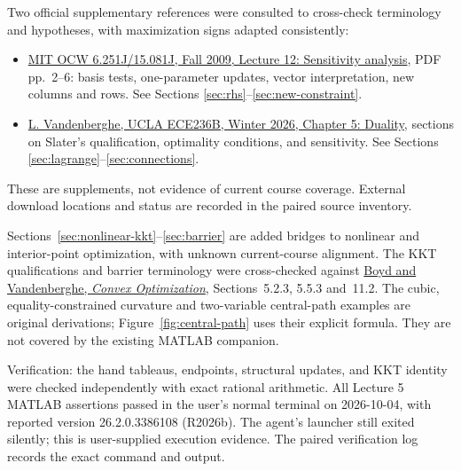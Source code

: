 \documentclass[11pt,a4paper]{article}
\begin{document}
{  Two official supplementary references were consulted to cross-check terminology
  and hypotheses, with maximization signs adapted consistently:
  \begin{itemize}[leftmargin=*]
    \item \href{https://ocw.mit.edu/courses/6-251j-introduction-to-mathematical-programming-fall-2009/370982a2d3b22e090aa7a8d573bb5604_MIT6_251JF09_lec12.pdf}
          {MIT OCW 6.251J/15.081J, Fall 2009, Lecture 12: Sensitivity analysis},
          PDF pp.\ 2--6: basis tests, one-parameter updates, vector interpretation,
          new columns and rows. See Sections \ref{sec:rhs}--\ref{sec:new-constraint}.
    \item \href{https://www.seas.ucla.edu/~vandenbe/ee236b/lectures/duality.pdf}
          {L. Vandenberghe, UCLA ECE236B, Winter 2026, Chapter 5: Duality},
          sections on Slater's qualification, optimality conditions, and sensitivity.
          See Sections \ref{sec:lagrange}--\ref{sec:connections}.
  \end{itemize}
  These are supplements, not evidence of current course coverage. External
  download locations and status are recorded in the paired source inventory.

  Sections~\ref{sec:nonlinear-kkt}--\ref{sec:barrier} are added bridges to
  nonlinear and interior-point optimization, with unknown current-course
  alignment. The KKT qualifications and barrier terminology were cross-checked
  against \href{https://web.stanford.edu/~boyd/cvxbook/}{Boyd and Vandenberghe,
    \emph{Convex Optimization}}, Sections~5.2.3, 5.5.3 and~11.2.
  The cubic, equality-constrained curvature and two-variable central-path
  examples are original derivations; Figure~\ref{fig:central-path} uses their
  explicit formula. They are not covered by the existing MATLAB companion.

  Verification: the hand tableaus, endpoints, structural updates, and KKT identity
  were checked independently with exact rational arithmetic. All Lecture 5 MATLAB assertions passed in the user's normal terminal on
  2026-10-04, with reported version 26.2.0.3386108 (R2026b).
  The agent's launcher still exited silently; this is user-supplied execution
  evidence. The paired verification log records the exact command and output.
}
\end{document}
